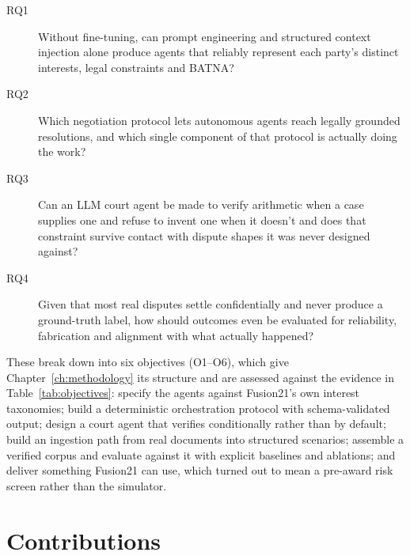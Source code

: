 \begin{description}
 \item[RQ1] Without fine-tuning, can prompt engineering and structured context
 injection alone produce agents that reliably represent each party's distinct
 interests, legal constraints and BATNA?
 \item[RQ2] Which negotiation protocol lets autonomous agents reach legally
 grounded resolutions, and which single component of that protocol is
 actually doing the work?
 \item[RQ3] Can an LLM court agent be made to verify arithmetic when a case
 supplies one and refuse to invent one when it doesn't and does that
 constraint survive contact with dispute shapes it was never designed
 against?
 \item[RQ4] Given that most real disputes settle confidentially and never
 produce a ground-truth label, how should outcomes even be evaluated for
 reliability, fabrication and alignment with what actually happened?
\end{description}

These break down into six objectives (O1--O6), which give
Chapter~\ref{ch:methodology} its structure and are assessed against the evidence
in Table~\ref{tab:objectives}: specify the agents against Fusion21's own interest
taxonomies; build a deterministic orchestration protocol with schema-validated
output; design a court agent that verifies conditionally rather than by default;
build an ingestion path from real documents into structured scenarios; assemble a
verified corpus and evaluate against it with explicit baselines and ablations; and
deliver something Fusion21 can use, which turned out to mean a pre-award risk
screen rather than the simulator.

\section{Contributions}
\label{sec:contributions}


